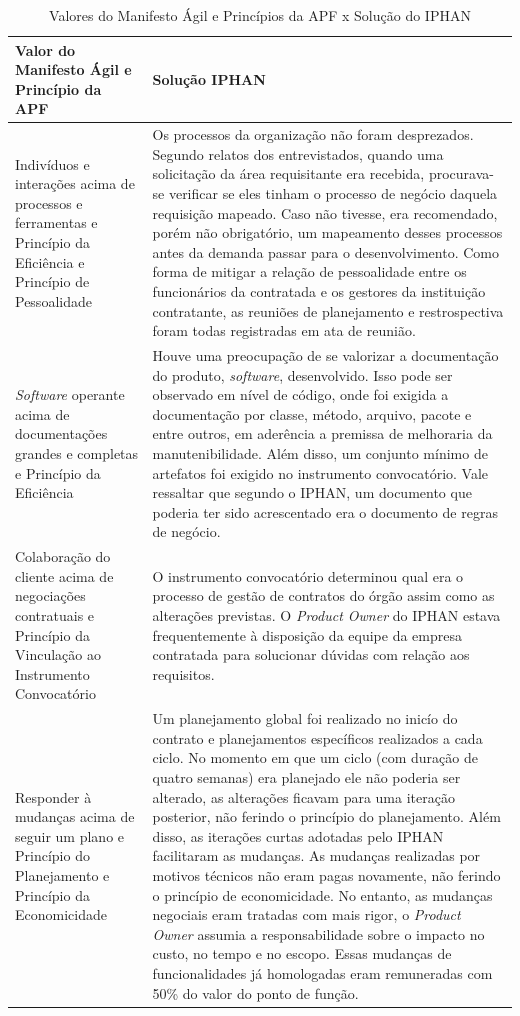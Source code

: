 \begin{table}[H]
\center
\footnotesize
\begin{tabular}{|p{6cm}|p{8cm}|}
  \hline
   \textbf{Valor do Manifesto Ágil e Princípio da APF} & \textbf{Solução IPHAN}\\
    \hline
  Indivíduos e interações acima de processos e ferramentas e Princípio da Eficiência e Princípio de Pessoalidade &  Os processos da organização não foram desprezados. Segundo relatos dos entrevistados, quando uma solicitação da área requisitante era recebida, procurava-se verificar se eles tinham o processo de negócio daquela requisição mapeado. Caso não tivesse, era recomendado, porém não obrigatório, um mapeamento desses processos antes da demanda passar para o desenvolvimento.  Como forma de mitigar a relação de pessoalidade entre os funcionários da contratada e os gestores da instituição contratante, as reuniões de planejamento e restrospectiva foram todas registradas em ata de reunião. \\
   \hline    
 \textit{Software} operante acima de documentações grandes e completas e Princípio da Eficiência & Houve uma preocupação de se valorizar a documentação do produto, \textit{software}, desenvolvido. Isso pode ser observado em nível de código, onde foi exigida a documentação por classe, método, arquivo, pacote e entre outros, em aderência a premissa de melhoraria da manutenibilidade. Além disso, um conjunto
mínimo de artefatos foi exigido no instrumento
convocatório. Vale ressaltar que segundo o IPHAN, um documento que poderia ter sido acrescentado era o documento de regras de negócio.\\
    \hline
  Colaboração do cliente acima de negociações contratuais e Princípio da Vinculação ao Instrumento Convocatório &  O instrumento convocatório determinou qual era o processo de gestão de contratos do órgão assim como as alterações previstas. O \textit{Product Owner} do IPHAN estava frequentemente à disposição da equipe da empresa contratada para solucionar dúvidas com relação aos requisitos.\\
   \hline
  Responder à mudanças acima de seguir um plano e Princípio do Planejamento e Princípio da Economicidade & Um planejamento global foi realizado no inicío do contrato e planejamentos específicos realizados a cada ciclo. No momento em que um ciclo (com duração de quatro semanas) era planejado ele não poderia ser alterado, as alterações ficavam para uma iteração posterior, não ferindo o princípio do planejamento. Além disso, as iterações curtas adotadas pelo IPHAN facilitaram as mudanças. As mudanças realizadas por motivos técnicos não eram pagas novamente, não ferindo o princípio de economicidade. No entanto, as mudanças negociais eram tratadas com mais rigor, o \textit{Product Owner} assumia a responsabilidade sobre o impacto no custo, no tempo e no escopo. Essas mudanças de funcionalidades já homologadas eram remuneradas com 50\% do valor do ponto de função. \\
   \hline
\end{tabular}
\caption{Valores do Manifesto Ágil e Princípios da APF x Solução do IPHAN}
\label{apfiphan}
\end{table}


